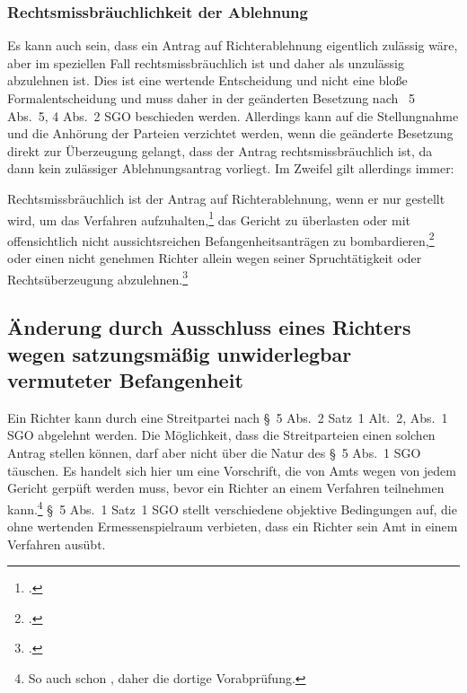 \subsubsection{Rechtsmissbräuchlichkeit der Ablehnung}
\label{Zusammensetzung:Spruchkoerper:Befangenheitsbesorgnis:Rechtsmissbrauch}
Es kann auch sein, dass ein Antrag auf Richterablehnung eigentlich zulässig wäre, aber im speziellen Fall rechtsmissbräuchlich ist und daher als unzulässig abzulehnen ist.
Dies ist eine wertende Entscheidung und nicht eine bloße Formalentscheidung und muss daher in der geänderten Besetzung nach \SSS~5 Abs.~5, 4 Abs.~2 SGO beschieden werden.
Allerdings kann auf die Stellungnahme und die Anhörung der Parteien verzichtet werden, wenn die geänderte Besetzung direkt zur Überzeugung gelangt, dass der Antrag rechtsmissbräuchlich ist, da dann kein zulässiger Ablehnungsantrag vorliegt.
Im Zweifel gilt allerdings immer: 

Rechtsmissbräuchlich ist der Antrag auf Richterablehnung, wenn er nur gestellt wird, um das Verfahren aufzuhalten,\footnote{\cites[S.~8]{BSG2815HS}.} das Gericht zu überlasten oder mit offensichtlich nicht aussichtsreichen Befangenheitsanträgen zu bombardieren,\footnote{\cites[S.~4]{BSG201305062BefangenheitII}.} oder einen nicht genehmen Richter allein wegen seiner Spruchtätigkeit oder Rechtsüberzeugung abzulehnen.\footnote{\cites[S.~5]{BSG115HSBefangeheitIV}{OLGNaumburg3WF7609}.}

\subsection{Änderung durch Ausschluss eines Richters wegen satzungsmäßig unwiderlegbar vermuteter Befangenheit}
\label{Zusammensetzung:Spruchkoerper:Befangenheitsvermutung}
Ein Richter kann durch eine Streitpartei nach \S~5 Abs.~2 Satz~1 Alt.~2, Abs.~1 SGO abgelehnt werden.
Die Möglichkeit, dass die Streitparteien einen solchen Antrag stellen können, darf aber nicht über die Natur des \S~5 Abs.~1 SGO täuschen.
Es handelt sich hier um eine Vorschrift, die von Amts wegen von jedem Gericht gerpüft werden muss, bevor ein Richter an einem Verfahren teilnehmen kann.\footnote{So auch schon \cite{BSGPP100127862}, daher die dortige Vorabprüfung.} \S~5 Abs.~1 Satz~1 SGO stellt verschiedene objektive Bedingungen auf, die ohne wertenden Ermessenspielraum verbieten, dass ein Richter sein Amt in einem Verfahren ausübt.

